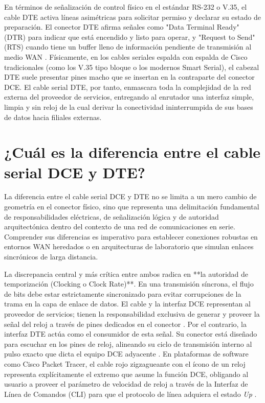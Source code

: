 \documentclass[a4paper,12pt]{article}
\begin{document}
En términos de señalización de control físico en el estándar RS-232 o V.35, el cable DTE activa líneas asimétricas para solicitar permiso y declarar su estado de preparación. El conector DTE afirma señales como "Data Terminal Ready" (DTR) para indicar que está encendido y listo para operar, y "Request to Send" (RTS) cuando tiene un buffer lleno de información pendiente de transmisión al medio WAN \cite{dte_dce_difference}. Físicamente, en los cables seriales espalda con espalda de Cisco tradicionales (como los V.35 tipo bloque o los modernos Smart Serial), el cabezal DTE suele presentar pines macho que se insertan en la contraparte del conector DCE. El cable serial DTE, por tanto, enmascara toda la complejidad de la red externa del proveedor de servicios, entregando al enrutador una interfaz simple, limpia y sin reloj de la cual derivar la conectividad ininterrumpida de sus bases de datos hacia filiales externas.

\section{¿Cuál es la diferencia entre el cable serial DCE y DTE?}

La diferencia entre el cable serial DCE y DTE no se limita a un mero cambio de geometría en el conector físico, sino que representa una delimitación fundamental de responsabilidades eléctricas, de señalización lógica y de autoridad arquitectónica dentro del contexto de una red de comunicaciones en serie. Comprender sus diferencias es imperativo para establecer conexiones robustas en entornos WAN heredados o en arquitecturas de laboratorio que simulan enlaces sincrónicos de larga distancia.

La discrepancia central y más crítica entre ambos radica en **la autoridad de temporización (Clocking o Clock Rate)**. En una transmisión síncrona, el flujo de bits debe estar estrictamente sincronizado para evitar corrupciones de la trama en la capa de enlace de datos. El cable y la interfaz DCE representan al proveedor de servicios; tienen la responsabilidad exclusiva de generar y proveer la señal del reloj a través de pines dedicados en el conector \cite{dte_dce_difference, dte_dce_packet_tracer}. Por el contrario, la interfaz DTE actúa como el consumidor de esta señal. Su conector está diseñado para escuchar en los pines de reloj, alineando su ciclo de transmisión interno al pulso exacto que dicta el equipo DCE adyacente \cite{dte_dce_speeds}. En plataformas de software como Cisco Packet Tracer, el cable rojo zigzagueante con el ícono de un reloj representa explícitamente el extremo que asume la función DCE, obligando al usuario a proveer el parámetro de velocidad de reloj a través de la Interfaz de Línea de Comandos (CLI) para que el protocolo de línea adquiera el estado \textit{Up} \cite{dte_dce_packet_tracer}.
\end{document}
